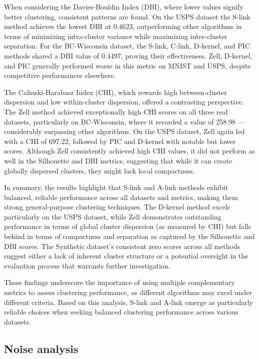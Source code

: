 \documentclass[
	10pt,
	parskip=half-,	
	paper=a4,
	english
	]{scrartcl}
\begin{document}
When considering the Davies-Bouldin Index (DBI), where lower values signify better clustering, consistent patterns are found. On the USPS dataset the S-link method achieves the lowest DBI at 0.4623, outperforming other algorithms in terms of minimizing intra-cluster variance while maximizing inter-cluster separation. For the BC-Wisconsin dataset, the S-link, C-link, D-kernel, and PIC methods shared a DBI value of 0.4497, proving their effectiveness. Zell, D-kernel, and PIC generally performed worse in this metric on MNIST and USPS, despite competitive performances elsewhere.

The Calinski-Harabasz Index (CHI), which rewards high between-cluster dispersion and low within-cluster dispersion, offered a contrasting perspective. The Zell method achieved exceptionally high CHI scores on all three real datasets, particularly on BC-Wisconsin, where it recorded a value of 258.98 — considerably surpassing other algorithms. On the USPS dataset, Zell again led with a CHI of 697.22, followed by PIC and D-kernel with notable but lower scores. Although Zell consistently achieved high CHI values, it did not perform as well in the Silhouette and DBI metrics, suggesting that while it can create globally dispersed clusters, they might lack local compactness.

In summary, the results highlight that S-link and A-link methods exhibit balanced, reliable performance across all datasets and metrics, making them strong general-purpose clustering techniques. The D-kernel method excels particularly on the USPS dataset, while Zell demonstrates outstanding performance in terms of global cluster dispersion (as measured by CHI) but falls behind in terms of compactness and separation as captured by the Silhouette and DBI scores. The Synthetic dataset’s consistent zero scores across all methods suggest either a lack of inherent cluster structure or a potential oversight in the evaluation process that warrants further investigation.

These findings underscore the importance of using multiple complementary metrics to assess clustering performance, as different algorithms may excel under different criteria. Based on this analysis, S-link and A-link emerge as particularly reliable choices when seeking balanced clustering performance across various datasets.

\subsection{Noise analysis}
\end{document}
